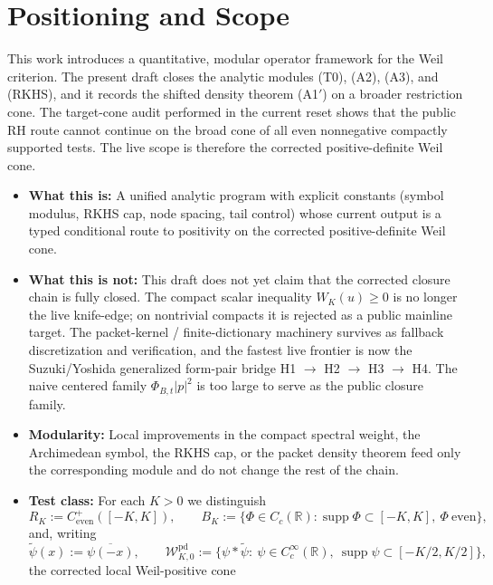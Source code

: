 \section{Positioning and Scope}\label{sec:scope}

This work introduces a quantitative, modular operator framework for the Weil criterion. The present draft closes the analytic modules \textup{(T0)}, \textup{(A2)}, \textup{(A3)}, and \textup{(RKHS)}, and it records the shifted density theorem \textup{(A1$'$)} on a broader restriction cone. The target-cone audit performed in the current reset shows that the public RH route cannot continue on the broad cone of all even nonnegative compactly supported tests. The live scope is therefore the corrected positive-definite Weil cone.

\begin{itemize}
  \item \textbf{What this is:} A unified analytic program with explicit constants (symbol modulus, RKHS cap, node spacing, tail control) whose current output is a typed conditional route to positivity on the corrected positive-definite Weil cone.
  \item \textbf{What this is not:} This draft does not yet claim that the corrected closure chain is fully closed. The compact scalar inequality $W_K(u)\ge0$ is no longer the live knife-edge; on nontrivial compacts it is rejected as a public mainline target. The packet-kernel / finite-dictionary machinery survives as fallback discretization and verification, and the fastest live frontier is now the Suzuki/Yoshida generalized form-pair bridge \textup{H1} $\to$ \textup{H2} $\to$ \textup{H3} $\to$ \textup{H4}. The naive centered family $\Phi_{B,t}|p|^2$ is too large to serve as the public closure family.
  \item \textbf{Modularity:} Local improvements in the compact spectral weight, the Archimedean symbol, the RKHS cap, or the packet density theorem feed only the corresponding module and do not change the rest of the chain.
  \item \textbf{Test class:} For each $K>0$ we distinguish
  \[
    R_K := C^+_{\mathrm{even}}([-K,K]),
    \qquad
    B_K := \bigl\{\Phi\in C_c(\mathbb R): \operatorname{supp}\Phi\subset[-K,K],\ \Phi\ \text{even}\bigr\},
  \]
  and, writing
  \[
    \widetilde{\psi}(x):=\overline{\psi(-x)},
    \qquad
    \mathcal W_{K,0}^{\mathrm{pd}}
    :=\bigl\{\psi*\widetilde{\psi}:\ \psi\in C_c^\infty(\mathbb R),\ \operatorname{supp}\psi\subset[-K/2,K/2]\bigr\},
  \]
  the corrected local Weil-positive cone

\end{itemize}
